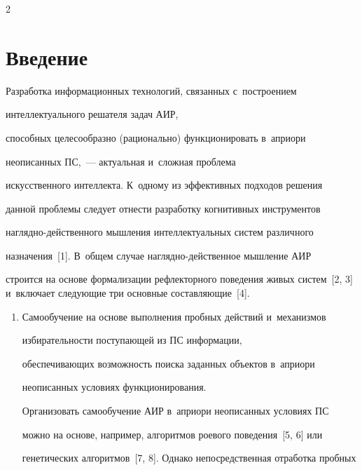 \begin{multicols}{2}





\label{st\stat}


 


\section{Введение}





  Разработка информационных технологий, связанных с~по\-стро\-ен\-ием 


интеллектуального решателя задач АИР, 


способных целесообразно (рационально) функционировать в~априори 


неописанных ПС,~--- актуальная и~слож\-ная проб\-ле\-ма 


искусственного интеллекта. К~одному из эффективных подходов решения 


данной проб\-ле\-мы следует отнести разработку когнитивных инструментов 


на\-гляд\-но-дей\-ст\-вен\-но\-го мышления интеллектуальных сис\-тем различного 


назначения~[1]. В~общем случае на\-гляд\-но-дей\-ст\-вен\-ное мыш\-ле\-ние АИР 


строится на основе формализации рефлекторного поведения живых сис\-тем~[2, 3] и~включает сле\-ду\-ющие три основные со\-став\-ля\-ющие~[4]. 


  \begin{enumerate}[1.]


  \item Самообучение на основе выполнения пробных действий и~механизмов 


избирательности по\-сту\-па\-ющей из ПС информации, 


обес\-пе\-чи\-ва\-ющих воз\-мож\-ность поиска заданных объектов в~априори 


неописанных условиях функционирования. 


  


  Организовать самообучение АИР в~априори неописанных условиях ПС 


можно на основе, например, алгоритмов роевого поведения~[5, 6] или 


генетических алгоритмов~[7, 8]. Однако непосредственная отработка проб\-ных 



\end{enumerate}
\end{multicols}

